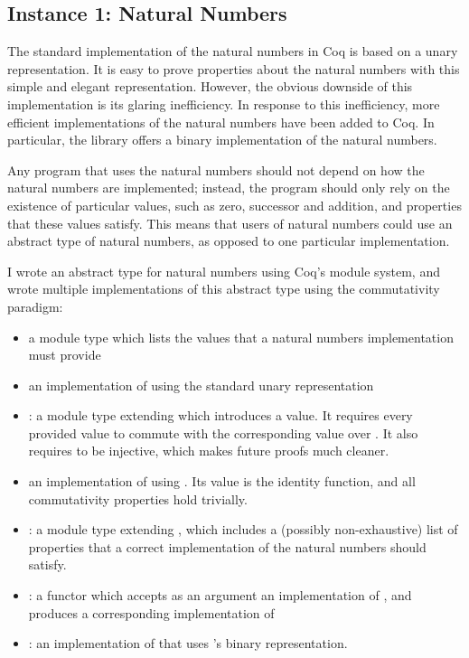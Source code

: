 \documentclass[12pt]{article}
\begin{document}
\subsection{Instance 1: Natural Numbers}

  The standard implementation of the natural numbers in Coq is based on a unary representation. It is easy to prove properties about the natural numbers with this simple and elegant representation. However, the obvious downside of this implementation is its glaring inefficiency. In response to this inefficiency, more efficient implementations of the natural numbers have been added to Coq. In particular, the  library offers a binary implementation of the natural numbers.

  \bigskip

  \noindent Any program that uses the natural numbers should not depend on how the natural numbers are implemented; instead, the program should only rely on the existence of particular values, such as zero, successor and addition, and properties that these values satisfy. This means that users of natural numbers could use an abstract type of natural numbers, as opposed to one particular implementation.

  \bigskip

  \noindent I wrote an abstract type for natural numbers using Coq's module system, and wrote multiple implementations of this abstract type using the commutativity paradigm:

  \begin{itemize}
    \item {} a module type which lists the values that a natural numbers implementation must provide
    \item {} an implementation of  using the standard unary representation
    \item {}: a module type extending  which introduces a  value. It requires every provided value to commute with the corresponding  value over . It also requires  to be injective, which makes future proofs much cleaner.
    \item {} an implementation of  using . Its  value is the identity function, and all commutativity properties hold trivially.
    \item {}: a module type extending , which includes a (possibly non-exhaustive) list of properties that a correct implementation of the natural numbers should satisfy.
    \item {}: a functor which accepts as an argument an implementation of , and produces a corresponding implementation of 
    \item {}: an implementation of  that uses 's binary representation.
  \end{itemize}
\end{document}
